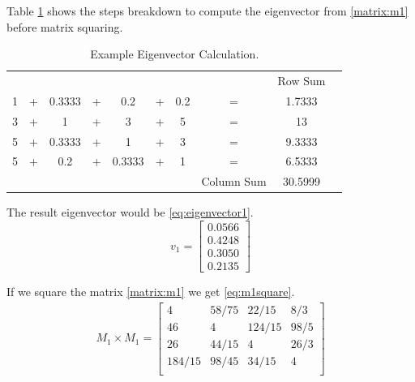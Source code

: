 Table \ref{table:example_eigenvector} shows the steps breakdown to compute the eigenvector from \eqref{matrix:m1} before matrix squaring.

\begin{table}[ht]
\begin{center}
\caption{Example Eigenvector Calculation.}
\label{table:example_eigenvector}
\begin{tabular}{cccccccccc}
          &   &        &   &        &   &     &            & Row Sum \\
        1 & + & 0.3333 & + & 0.2    & + & 0.2 & =          & 1.7333  \\
        3 & + & 1      & + & 3      & + & 5   & =          & 13      \\
        5 & + & 0.3333 & + & 1      & + & 3   & =          & 9.3333  \\
        5 & + & 0.2    & + & 0.3333 & + & 1   & =          & 6.5333  \\
          &   &        &   &        &   &     & Column Sum & 30.5999 \\        
\end{tabular}
\end{center}
\end{table}

The result eigenvector would be \eqref{eq:eigenvector1}.
\begin{equation}
\label{eq:eigenvector1}
v_1=
\left[ 
\begin{array}{c} 
0.0566 \\ 
0.4248 \\
0.3050 \\
0.2135
\end{array} 
\right] 
\end{equation}

If we square the matrix \eqref{matrix:m1} we get \eqref{eq:m1square}.
\begin{equation}
\label{eq:m1square}
\begin{array}{c}
    M_1 \times M_1 =
    \begin{bmatrix}
        4      & 58/75 & 22/15  & 8/3 \\
        46     & 4     & 124/15 & 98/5 \\
        26     & 44/15 & 4      & 26/3 \\
        184/15 & 98/45 & 34/15  & 4\\
    \end{bmatrix}\\
\end{array}
\end{equation}

